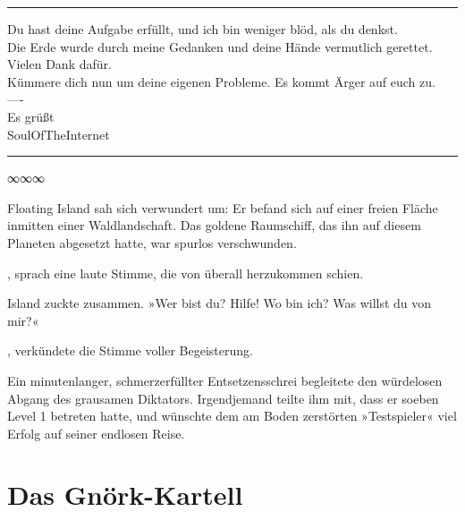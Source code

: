 \noindent \parbox{\textwidth}{ \vspace{3ex} \hrule \vspace{3ex}

    \begin{tiny}
    \begin{ttfamily}

\noindent Du hast deine Aufgabe erfüllt, und ich bin weniger blöd, als du denkst.\\
\noindent Die Erde wurde durch meine Gedanken und deine Hände vermutlich gerettet. Vielen Dank dafür.\\
\noindent Kümmere dich nun um deine eigenen Probleme. Es kommt Ärger auf euch zu.\\
\noindent ----\\
\noindent Es grüßt\\
\noindent SoulOfTheInternet

    \end{ttfamily}
    \end{tiny}

\vspace{3ex} \hrule \vspace{3ex} }

\begin{center}
∞∞∞
\end{center}

Floating Island sah sich verwundert um: Er befand sich auf einer freien Fläche inmitten einer Waldlandschaft. Das goldene Raumschiff, das ihn auf diesem Planeten abgesetzt hatte, war spurlos verschwunden.

, sprach eine laute Stimme, die von überall herzukommen schien.

Island zuckte zusammen. »Wer bist du? Hilfe! Wo bin ich? Was willst du von mir?«

, verkündete die Stimme voller Begeisterung. 

Ein minutenlanger, schmerzerfüllter Entsetzensschrei begleitete den würdelosen Abgang des grausamen Diktators. Irgendjemand teilte ihm mit, dass er soeben Level 1 betreten hatte, und wünschte dem am Boden zerstörten »Testspieler« viel Erfolg auf seiner endlosen Reise.


\part{Das Gnörk-Kartell}

